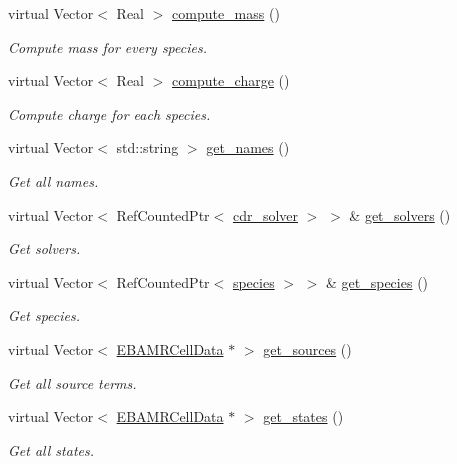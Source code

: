 \begin{DoxyCompactItemize}
virtual Vector$<$ Real $>$ \hyperlink{classcdr__layout_a2480c5bbd25a50c63b86921101e8c4bc}{compute\+\_\+mass} ()
\begin{DoxyCompactList}\small\item\em Compute mass for every species. \end{DoxyCompactList}\item 
virtual Vector$<$ Real $>$ \hyperlink{classcdr__layout_aa6620db1974757e5d7abbee5afa9b40b}{compute\+\_\+charge} ()
\begin{DoxyCompactList}\small\item\em Compute charge for each species. \end{DoxyCompactList}\item 
virtual Vector$<$ std\+::string $>$ \hyperlink{classcdr__layout_a1110a78b91cbbb2cac16e3265318fff8}{get\+\_\+names} ()
\begin{DoxyCompactList}\small\item\em Get all names. \end{DoxyCompactList}\item 
virtual Vector$<$ Ref\+Counted\+Ptr$<$ \hyperlink{classcdr__solver}{cdr\+\_\+solver} $>$ $>$ \& \hyperlink{classcdr__layout_a97333f7b7971fe998ae1a00820bacbd9}{get\+\_\+solvers} ()
\begin{DoxyCompactList}\small\item\em Get solvers. \end{DoxyCompactList}\item 
virtual Vector$<$ Ref\+Counted\+Ptr$<$ \hyperlink{classspecies}{species} $>$ $>$ \& \hyperlink{classcdr__layout_a5233bb1dee5a521eae5e99ee3625f189}{get\+\_\+species} ()
\begin{DoxyCompactList}\small\item\em Get species. \end{DoxyCompactList}\item 
virtual Vector$<$ \hyperlink{type__definitions_8H_a7e610f301989e5e07781c5e338bdb7c3}{E\+B\+A\+M\+R\+Cell\+Data} $\ast$ $>$ \hyperlink{classcdr__layout_aa6ee57d0f86a83050d9c33295a8ab496}{get\+\_\+sources} ()
\begin{DoxyCompactList}\small\item\em Get all source terms. \end{DoxyCompactList}\item 
virtual Vector$<$ \hyperlink{type__definitions_8H_a7e610f301989e5e07781c5e338bdb7c3}{E\+B\+A\+M\+R\+Cell\+Data} $\ast$ $>$ \hyperlink{classcdr__layout_a0a19a86040b39a6b4b80f55364d4e106}{get\+\_\+states} ()
\begin{DoxyCompactList}\small\item\em Get all states. \end{DoxyCompactList}\item 

\end{DoxyCompactItemize}
